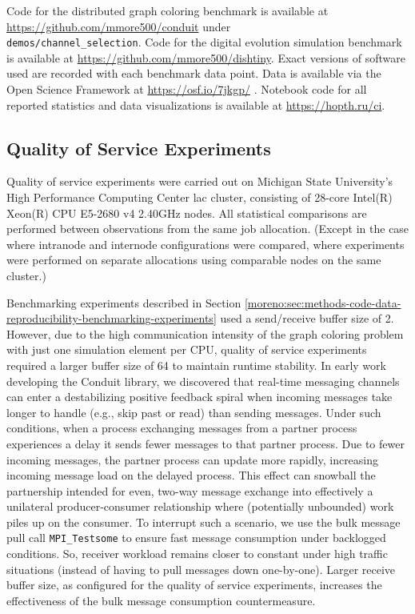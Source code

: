 Code for the distributed graph coloring benchmark is available at \url{https://github.com/mmore500/conduit} under \\ \texttt{demos/channel\_selection}.
Code for the digital evolution simulation benchmark is available at \url{https://github.com/mmore500/dishtiny}.
Exact versions of software used are recorded with each benchmark data point.
Data is available via the Open Science Framework at \url{https://osf.io/7jkgp/} \citep{foster2017open}.
Notebook code for all reported statistics and data visualizations is available at \url{https://hopth.ru/ci}.

\subsection{Quality of Service Experiments}

Quality of service experiments were carried out on Michigan State University's High Performance Computing Center lac cluster, consisting of 28-core Intel(R) Xeon(R) CPU E5-2680 v4 \@ 2.40GHz nodes.
All statistical comparisons are performed between observations from the same job allocation.
(Except in the case where intranode and internode configurations were compared, where experiments were performed on separate allocations using comparable nodes on the same cluster.)

Benchmarking experiments described in Section \ref{moreno:sec:methods-code-data-reproducibility-benchmarking-experiments} used a send/receive buffer size of 2.
However, due to the high communication intensity of the graph coloring problem with just one simulation element per CPU, quality of service experiments required a larger buffer size of 64 to maintain runtime stability.
In early work developing the Conduit library, we discovered that real-time messaging channels can enter a destabilizing positive feedback spiral when incoming messages take longer to handle (e.g., skip past or read) than sending messages.
Under such conditions, when a process exchanging messages from a partner process experiences a delay it sends fewer messages to that partner process.
Due to fewer incoming messages, the partner process can update more rapidly, increasing incoming message load on the delayed process.
This effect can snowball the partnership intended for even, two-way message exchange into effectively a unilateral producer-consumer relationship where (potentially unbounded) work piles up on the consumer.
To interrupt such a scenario, we use the bulk message pull call \verb|MPI_Testsome| to ensure fast message consumption under backlogged conditions.
So, receiver workload remains closer to constant under high traffic situations (instead of having to pull messages down one-by-one).
Larger receive buffer size, as configured for the quality of service experiments, increases the effectiveness of the bulk message consumption countermeasure.
